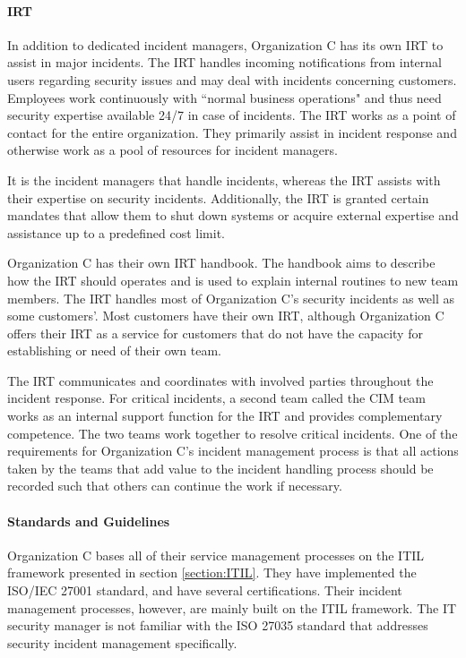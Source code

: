 \paragraph{\acl{IRT}}
In addition to dedicated incident managers, Organization C has its own \ac{IRT} to assist in major incidents. The \ac{IRT} handles incoming notifications from internal users regarding security issues and may deal with incidents concerning customers. Employees work continuously with ``normal business operations" and thus need security expertise available 24/7 in case of incidents. The \ac{IRT} works as a point of contact for the entire organization. They primarily assist in incident response and otherwise work as a pool of resources for incident managers. 

It is the incident managers that handle incidents, whereas the \ac{IRT} assists with their expertise on security incidents. Additionally, the \ac{IRT} is granted certain mandates that allow them to shut down systems or acquire external expertise and assistance up to a predefined cost limit.    

Organization C has their own \ac{IRT} handbook. The handbook aims to describe how the \ac{IRT} should operates and is used to explain internal routines to new team members. The \ac{IRT} handles most of Organization C's security incidents as well as some customers'. Most customers have their own \ac{IRT}, although Organization C offers their \ac{IRT} as a service for customers that do not have the capacity for establishing or need of their own team.

The \ac{IRT} communicates and coordinates with involved parties throughout the incident response. For critical incidents, a second team called the \ac{CIM} team works as an internal support function for the \ac{IRT} and provides complementary competence. The two teams work together to resolve critical incidents. One of the requirements for Organization C's incident management process is that all actions taken by the teams that add value to the incident handling process should be recorded such that others can continue the work if necessary.

\paragraph{Standards and Guidelines}
Organization C bases all of their service management processes on the ITIL framework presented in section \ref{section:ITIL}. They have implemented the ISO/IEC 27001 standard, and have several certifications. Their incident management processes, however, are mainly built on the ITIL framework. The IT security manager is not familiar with the ISO 27035 standard that addresses security incident management specifically. 


